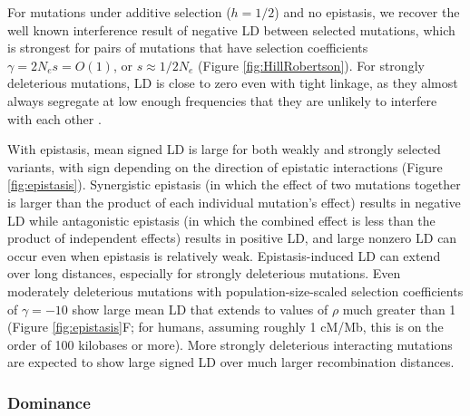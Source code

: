\documentclass[]{article}
\begin{document}
For mutations under additive selection (\(h=1/2\)) and no epistasis, we
recover the well known \citet{Hill1966-gv} interference result of negative LD
between selected mutations, which is strongest for pairs of mutations that have
selection coefficients \(\gamma = 2N_es = O(1)\), or \(s \approx 1/2N_e\) (Figure
\ref{fig:HillRobertson}).
For strongly deleterious mutations, LD is close to zero even
with tight linkage, as they almost always segregate at low enough frequencies
that they are unlikely to interfere with each other \citep{McVean2000-ox}.

With epistasis, mean signed LD is large for both weakly and strongly selected
variants, with sign depending on the direction of epistatic interactions
(Figure \ref{fig:epistasis}).
Synergistic epistasis (in which the effect of two mutations together is larger than
the product of each individual mutation's effect) results in negative LD while
antagonistic epistasis (in which the combined effect is less than the product of
independent effects) results in positive LD, and large nonzero LD can occur
even when epistasis is relatively weak. Epistasis-induced LD can
extend over long distances, especially for strongly deleterious mutations.
Even moderately deleterious mutations with
population-size-scaled selection coefficients of \(\gamma=-10\) show large mean
LD that extends to values of \(\rho\) much greater than 1
(Figure \ref{fig:epistasis}F; for humans, assuming
roughly 1 cM/Mb, this is on the order of 100 kilobases or more).
More strongly deleterious interacting mutations are expected to show large
signed LD over much larger recombination distances.

\subsubsection{Dominance}\label{sec:dominance}
\end{document}
